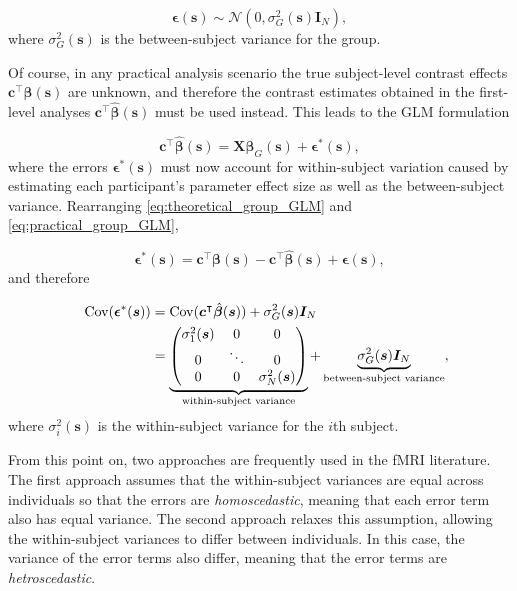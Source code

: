 \begin{equation}
\label{eq:group_errors}
\bm{\epsilon}(\bm{s}) \sim  \mathcal{N}(0, \sigma_{G}^{2}(\bm{s})\bm{I}_{N}),
\end{equation}
where $\sigma_{G}^{2}(\bm{s})$ is the between-subject variance for the group. 

Of course, in any practical analysis scenario the true subject-level contrast effects $\bm{c}^{\intercal}\bm{\beta}(\bm{s})$ are unknown, and therefore the contrast estimates obtained in the first-level analyses $\bm{c}^{\intercal}\hat{\bm{\beta}}(\bm{s})$ must be used instead. This leads to the GLM formulation

\begin{equation} 
\label{eq:practical_group_GLM}
\bm{c}^{\intercal}\hat{\bm{\beta}}(\bm{s}) = \bm{X}\bm{\beta}_{G}(\bm{s}) + \bm{\epsilon}^{*}(\bm{s}),
\end{equation}
where the errors $\bm{\epsilon}^{*}(\bm{s})$ must now account for within-subject variation caused by estimating each participant's parameter effect size as well as the between-subject variance. Rearranging \ref{eq:theoretical_group_GLM} and \ref{eq:practical_group_GLM}, 

\begin{equation} 
\label{eq:practical_group_errors}
\bm{\epsilon}^{*}(\bm{s}) = \bm{c}^{\intercal}\bm{\beta}(\bm{s}) - \bm{c}^{\intercal}\hat{\bm{\beta}}(\bm{s}) + \bm{\epsilon}(\bm{s}),
\end{equation}
and therefore

\begin{alignat}{4}
\label{group_error_covariance}
&&\mathrm{Cov}(\bm{\epsilon}^{*}(\bm{s}))
&= \mathrm{Cov}(\bm{c}^{\intercal}\hat{\bm{\beta}}(\bm{s})) + \sigma_{G}^{2}(\bm{s})\bm{I}_{N} \notag\\
&
&
&= \underbrace{\begin{pmatrix}
\sigma_{1}^{2}(\bm{s}) & 0 & 0 \\
0 & \ddots & 0 \\
0 & 0 & \sigma_{N}^{2}(\bm{s})
\end{pmatrix}}_{\text{within-subject variance}}
+ \underbrace{\sigma_{G}^{2}(\bm{s})\bm{I}_{N}}_{\text{between-subject variance}},
\end{alignat}
where $\sigma_{i}^{2}(\bm{s})$ is the within-subject variance for the $i$th subject. 

From this point on, two approaches are frequently used in the fMRI literature. The first approach assumes that the within-subject variances are equal across individuals so that the errors are \textit{homoscedastic}, meaning that each error term also has equal variance. The second approach relaxes this assumption, allowing the within-subject variances to differ between individuals. In this case, the variance of the error terms also differ, meaning that the error terms are \textit{hetroscedastic}.

